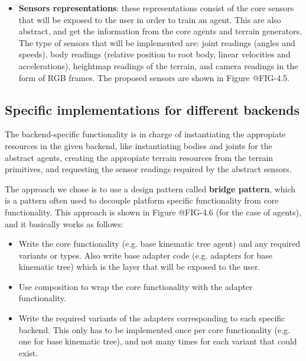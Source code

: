 \begin{itemize}
    \item \textbf{Sensors representations}: these representations consist of the core sensors that will be exposed
          to the user in order to train an agent. This are also abstract, and get the information from the
          core agents and terrain generators. The type of sensors that will be implemented are: joint readings (angles 
          and speeds), body readings (relative position to root body, linear velocities and accelerations), 
          heightmap readings of the terrain, and camera readings in the form of RGB frames. The proposed sensors are shown
          in Figure @FIG-4.5.

        \figFrameworkCoreSensor
\end{itemize}

\subsection{Specific implementations for different backends}


The backend-specific functionality is in charge of instantiating the appropiate 
resources in the given backend, like instantiating bodies and joints for the abstract 
agents, creating the appropiate terrain resources from the terrain primitives, and requesting
the sensor readings required by the abstract sensors.

The approach we chose is to use a design pattern called \textbf{bridge pattern}, which
is a pattern often used to decouple platform specific functionality from core functionality.
This approach is shown in Figure @FIG-4.6 (for the case of agents), and it basically
works as follows:

\begin{itemize}
    \item Write the core functionality (e.g. base kinematic tree agent) and any
          required variants or types. Also write base adapter code (e.g. adapters for base kinematic tree)
          which is the layer that will be exposed to the user.
    \item Use composition to wrap the core functionality with the adapter functionality.
    \item Write the required variants of the adapters corresponding to each specific backend.
          This only has to be implemented once per core functionality (e.g. one for base kinematic tree),
          and not many times for each variant that could exist.
\end{itemize}


